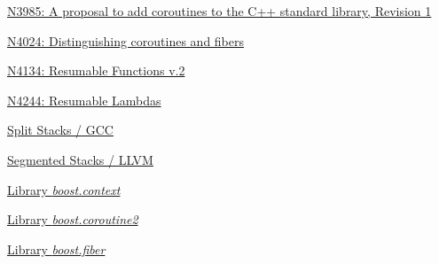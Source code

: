 \newpage
{}
\begin{thebibliography}{99}

        \href{http://www.open-std.org/jtc1/sc22/wg21/docs/papers/2014/n3985.pdf}
        {N3985: A proposal to add coroutines to the C++ standard library, Revision 1}

        \href{http://www.open-std.org/jtc1/sc22/wg21/docs/papers/2014/n4024.pdf}
        {N4024: Distinguishing coroutines and fibers}

        \href{http://www.open-std.org/jtc1/sc22/wg21/docs/papers/2014/n4134.pdf}
        {N4134: Resumable Functions v.2}

        \href{http://www.open-std.org/jtc1/sc22/wg21/docs/papers/2014/n4244.pdf}
        {N4244: Resumable Lambdas}

        \href{http://gcc.gnu.org/wiki/SplitStacks}
        {Split Stacks / GCC}

        \href{http://llvm.org/releases/3.0/docs/SegmentedStacks.html}
        {Segmented Stacks / LLVM}

        \href{https://github.com/boostorg/context}
        {Library \textit{boost.context}}

        \href{https://github.com/boostorg/coroutine2}
        {Library \textit{boost.coroutine2}}

        \href{https://github.com/olk/boost-fiber}
        {Library \textit{boost.fiber}}

\end{thebibliography}
